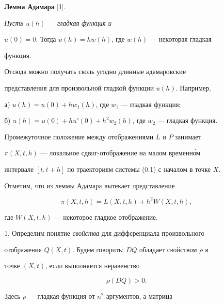 {\bf Лемма Адамара} [1]. {\it Пусть $u(h)$ --- гладкая функция и 


$u(0)=0$. Тогда $u(h)=h w(h)$, где $w(h)$ --- некоторая гладкая 


функция. 


} 


\medskip 


 


Отсюда можно получать сколь угодно длинные адамаровские 


представления для произвольной гладкой функции $u(h)$. Например, 


 


а) $u(h)=u(0)+h w_1(h)$, где $w_1$ --- гладкая функция; 


 


б) $u(h)=u(0)+h u'(0)+h^2w_2(h)$, где $w_2$ --- гладкая функция. 


 


Промежуточное положение между отображениями $L$ и $P$ занимает 


$\pi(X,t,h)$ --- локальное сдвиг-отображение на малом временн\'ом 


интервале $[t,t+h]$ по траекториям системы (0.1) с началом в точке $X$. 


Отметим, что из леммы Адамара вытекает представление 


\begin{equation} 


\pi(X,t,h)=L(X,t,h)+h^2W(X,t,h), 


\end{equation} 


где $W(X,t,h)$ --- некоторое гладкое отображение. 


 


1. Определим понятие {\it свойства} для дифференциала произвольного 


отображения $Q(X,t)$. Будем говорить: $D Q$ обладает свойством $\rho$ в 


точке $(X,t)$, если выполняется неравенство 


\begin{equation} 


\rho(D Q)>0. 


\end{equation} 


Здесь $\rho$ --- гладкая функция от $n^2$ аргументов, а матрица 


